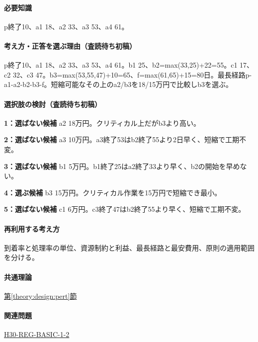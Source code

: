 \paragraph{必要知識} p終了10、a1 18、a2 33、a3 53、a4 61。

\paragraph{考え方・正答を選ぶ理由（査読待ち初稿）} p終了10、a1 18、a2 33、a3 53、a4 61。b1 25、b2=\allowbreak{}max(33,25)+22=\allowbreak{}55。c1 17、c2 32、c3 47。b3=\allowbreak{}max(53,55,47)+10=\allowbreak{}65、f=\allowbreak{}max(61,65)+15=\allowbreak{}80日。最長経路p-a1-a2-b2-b3-f。短縮可能なその上のa2/b3を18/15万円で比較しb3を選ぶ。

\paragraph{選択肢の検討（査読待ち初稿）}\mbox{}\par

\noindent\textbf{1：選ばない候補} a2 18万円。クリティカル上だがb3より高い。\par

\noindent\textbf{2：選ばない候補} a3 10万円。a3終了53はb2終了55より2日早く、短縮で工期不変。\par

\noindent\textbf{3：選ばない候補} b1 5万円。b1終了25はa2終了33より早く、b2の開始を早めない。\par

\noindent\textbf{4：選ぶ候補} b3 15万円。クリティカル作業を15万円で短縮でき最小。\par

\noindent\textbf{5：選ばない候補} c1 6万円。c3終了47はb2終了55より早く、短縮で工期不変。\par

\paragraph{再利用する考え方} 到着率と処理率の単位、資源制約と利益、最長経路と最安費用、原則の適用範囲を分ける。

\paragraph{共通理論} \hyperref[theory:design:pert]{第\ref*{theory:design:pert}節}

\paragraph{関連問題} \hyperref[q:h30-reg-basic-1-2]{H30-REG-BASIC-1-2}

